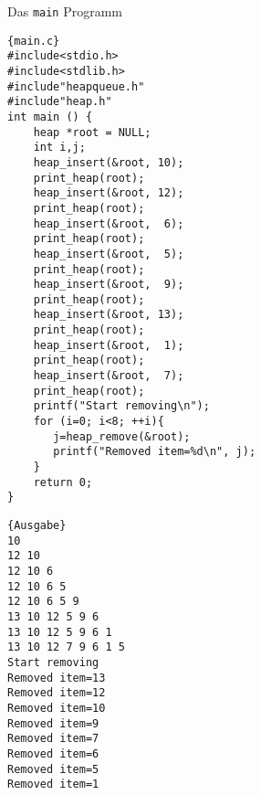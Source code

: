 \begin{myexampleprogram}{Das \texttt{main} Programm}
\begin{lstlisting}{main.c}
#include<stdio.h>
#include<stdlib.h>
#include"heapqueue.h"
#include"heap.h"
int main () {
    heap *root = NULL;
    int i,j;
    heap_insert(&root, 10);
    print_heap(root);
    heap_insert(&root, 12);
    print_heap(root);
    heap_insert(&root,  6);
    print_heap(root);
    heap_insert(&root,  5);
    print_heap(root);
    heap_insert(&root,  9);
    print_heap(root);
    heap_insert(&root, 13);
    print_heap(root);
    heap_insert(&root,  1);
    print_heap(root);
    heap_insert(&root,  7);
    print_heap(root);
    printf("Start removing\n");
    for (i=0; i<8; ++i){
       j=heap_remove(&root);
       printf("Removed item=%d\n", j);
    }
    return 0;
}
\end{lstlisting}
\begin{lstlisting}{Ausgabe}
10 
12 10 
12 10 6 
12 10 6 5 
12 10 6 5 9 
13 10 12 5 9 6 
13 10 12 5 9 6 1 
13 10 12 7 9 6 1 5 
Start removing
Removed item=13
Removed item=12
Removed item=10
Removed item=9
Removed item=7
Removed item=6
Removed item=5
Removed item=1
\end{lstlisting}
\end{myexampleprogram}
